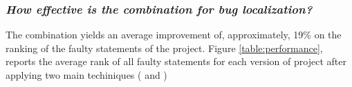 \documentclass{article}
\begin{document}
\subsubsection{\textit{How effective is the \comb{} combination for bug localization?}}

The \comb{} combination yields an average improvement of, approximately, 19\% on the ranking of the faulty statements of the \chart{}
project. Figure \ref{table:performance}, reports the average rank of all faulty statements for each version of \chart{} project after
applying two main techiniques (\sfl{} and \comb{})

		
		
		
\end{document}
